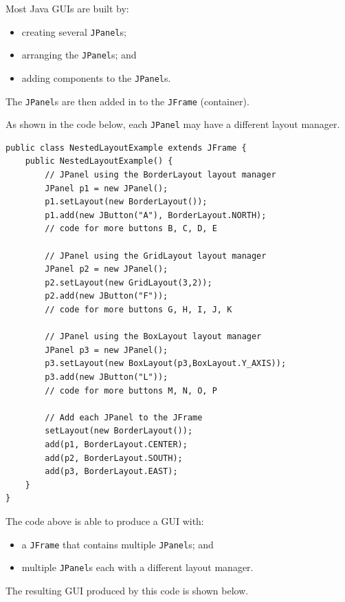 \documentclass[a4paper]{systems-software}
\begin{document}
Most Java GUIs are built by:
\begin{itemize}
	\item creating several \texttt{JPanel}s;
	\item arranging the \texttt{JPanel}s; and
	\item adding components to the \texttt{JPanel}s.
\end{itemize}

The \texttt{JPanel}s are then added in to the \texttt{JFrame} (container).

As shown in the code below, each \texttt{JPanel} may have a different layout manager.

\begin{lstlisting}[title={A class that uses nested layouts.}]
public class NestedLayoutExample extends JFrame {
	public NestedLayoutExample() {
		// JPanel using the BorderLayout layout manager
		JPanel p1 = new JPanel();
		p1.setLayout(new BorderLayout());
		p1.add(new JButton("A"), BorderLayout.NORTH);
		// code for more buttons B, C, D, E
		
		// JPanel using the GridLayout layout manager
		JPanel p2 = new JPanel();
		p2.setLayout(new GridLayout(3,2));
		p2.add(new JButton("F"));
		// code for more buttons G, H, I, J, K
		
		// JPanel using the BoxLayout layout manager
		JPanel p3 = new JPanel();
		p3.setLayout(new BoxLayout(p3,BoxLayout.Y_AXIS));
		p3.add(new JButton("L"));
		// code for more buttons M, N, O, P
		
		// Add each JPanel to the JFrame
		setLayout(new BorderLayout());
		add(p1, BorderLayout.CENTER);
		add(p2, BorderLayout.SOUTH);
		add(p3, BorderLayout.EAST);
	}
}
\end{lstlisting}

\newpage

The code above is able to produce a GUI with:
\begin{itemize}
	\item a \texttt{JFrame} that contains multiple \texttt{JPanel}s; and
	\item multiple \texttt{JPanel}s each with a different layout manager.
\end{itemize}

The resulting GUI produced by this code is shown below.
\end{document}

